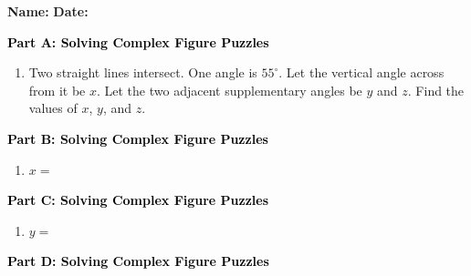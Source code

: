 \documentclass[12pt, letterpaper, fleqn]{article}
\newcommand{\blank}{\underline{\hspace{2.2cm}}}
\begin{document}
\textbf{Name:} \underline{\hspace{5cm}}
\hfill
\textbf{Date:} \underline{\hspace{3cm}}\\

\begin{tcolorbox}[colback=customteal!20]
\large\textcolor{black}{\textbf{Part A: Solving Complex Figure Puzzles}}
\end{tcolorbox}

\vspace{3mm}

\begin{enumerate}[itemsep=5.5cm, leftmargin=0.6cm]
\item Two straight lines intersect. One angle is $55^\circ$. Let the vertical angle across from it be $x$. Let the two adjacent supplementary angles be $y$ and $z$. Find the values of $x$, $y$, and $z$.
\end{enumerate}

\newpage

\begin{tcolorbox}[colback=customteal!20]
\large\textcolor{black}{\textbf{Part B: Solving Complex Figure Puzzles}}
\end{tcolorbox}

\vspace{3mm}

\begin{enumerate}[itemsep=5.5cm, leftmargin=0.6cm, resume]
\item $x = $ \blank
\end{enumerate}

\newpage

\begin{tcolorbox}[colback=customteal!20]
\large\textcolor{black}{\textbf{Part C: Solving Complex Figure Puzzles}}
\end{tcolorbox}

\vspace{3mm}

\begin{enumerate}[itemsep=5.5cm, leftmargin=0.6cm, resume]
\item $y = $ \blank
\end{enumerate}

\newpage

\begin{tcolorbox}[colback=customteal!20]
\large\textcolor{black}{\textbf{Part D: Solving Complex Figure Puzzles}}
\end{tcolorbox}
\end{document}
